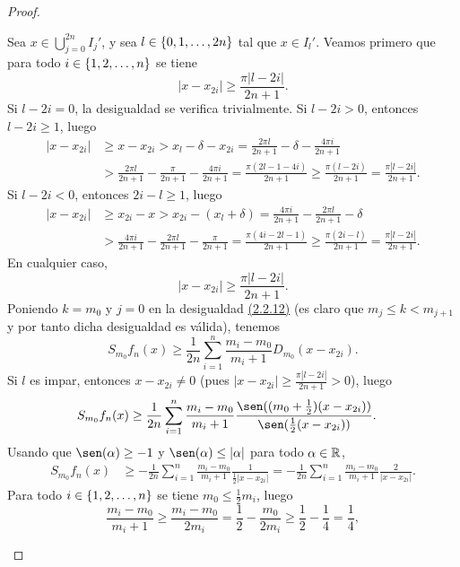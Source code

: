 \documentclass[a4paper, 12pt, oneside]{book}
\begin{document}
\begin{proof}
\begin{itemize}
        Sea $x \in \bigcup_{j=0}^{2n}I_j'$, y sea $l \in \{0,1,\mathellipsis,2n\}$ tal que $x \in I_l'$. Veamos primero que para todo $i \in \{1,2,\mathellipsis,n\}$ se tiene
        \[|x-x_{2i}| \geq \frac{\pi |l -2i|}{2n+1}.\]
        Si $l -2i = 0$, la desigualdad se verifica trivialmente. Si $l - 2i > 0$, entonces $l - 2i \geq 1$, luego
        \begin{align*}
            |x-x_{2i}| &\geq x-x_{2i} > x_l-\delta-x_{2i} = \frac{2\pi l}{2n+1}-\delta-\frac{4\pi i}{2n+1} \\ &> \frac{2\pi l}{2n+1}-\frac{\pi}{2n+1}-\frac{4\pi i}{2n+1}
            = \frac{\pi(2l-1-4i)}{2n+1} \geq \frac{\pi(l-2i)}{2n+1} = \frac{\pi|l-2i|}{2n+1}.
        \end{align*}
        Si $l - 2i < 0$, entonces $2i - l \geq 1$, luego
        \begin{align*}
            |x-x_{2i}| &\geq x_{2i}-x > x_{2i} - (x_l+\delta) = \frac{4\pi i}{2n+1} - \frac{2\pi l}{2n+1} - \delta \\ &>\frac{4\pi i}{2n+1} - \frac{2\pi l}{2n+1} -\frac{\pi}{2n+1}
            = \frac{\pi(4i-2l-1)}{2n+1} \geq \frac{\pi(2i-l)}{2n+1} = \frac{\pi|l-2i|}{2n+1}.
        \end{align*}
        En cualquier caso,
        \[|x-x_{2i}| \geq \frac{\pi |l -2i|}{2n+1}.\]
        Poniendo $k = m_0$ y $j = 0$ en la desigualdad \hyperref[2.2.12]{\color{blue}(2.2.12)} (es claro que $m_j \leq k < m_{j+1}$ y por tanto dicha desigualdad es válida), tenemos
        \[S_{m_0}f_n(x) \geq \frac{1}{2n}\sum_{i=1}^n \frac{m_i - m_0}{m_i + 1}D_{m_0}(x-x_{2i}).\]
        Si $l$ es impar, entonces $x-x_{2i} \neq 0$ (pues $|x-x_{2i}| \geq \frac{\pi |l-2i|}{2n+1} > 0$), luego
        \begin{align*}
            S_{m_0}f_n(x) &\geq \frac{1}{2n}\sum_{i=1}^n \frac{m_i-m_0}{m_i+1}\frac{\sen((m_0+\frac{1}{2})(x-x_{2i}))}{\sen(\frac{1}{2}(x-x_{2i}))}.
        \end{align*}
        Usando que $\sen(\alpha) \geq -1$ y $\sen(\alpha)\leq |\alpha|$ para todo $\alpha \in \mathbb R$,
        \begin{align*}
            S_{m_0}f_n(x) &\geq -\frac{1}{2n}\sum_{i=1}^n \frac{m_i-m_0}{m_i+1}\frac{1}{\frac{1}{2}|x-x_{2i}|} = -\frac{1}{2n}\sum_{i=1}^n \frac{m_i-m_0}{m_i+1}\frac{2}{|x-x_{2i}|} .
        \end{align*}
        Para todo $i \in \{1,2,\mathellipsis,n\}$ se tiene $m_0 \leq \frac{1}{2}m_i$, luego \[\frac{m_i-m_0}{m_i+1} \geq \frac{m_i-m_0}{2m_i} = \frac{1}{2}-\frac{m_0}{2m_i} \geq \frac{1}{2}-\frac{1}{4} = \frac{1}{4},\]

\end{itemize}
\end{proof}
\end{document}
